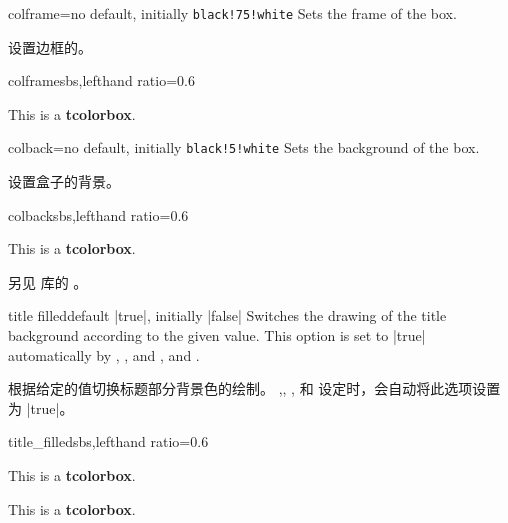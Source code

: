 \begin{docTcbKey}{colframe}{=}{no default, initially \texttt{black!75!white}}
Sets the frame  of the box.

设置边框的。
\begin{exdispExample*}{colframe}{sbs,lefthand ratio=0.6}
\begin{tcolorbox}[colframe=red!50!white]
This is a \textbf{tcolorbox}.
\end{tcolorbox}
\end{exdispExample*}
\end{docTcbKey}

\begin{docTcbKey}{colback}{=}{no default, initially \texttt{black!5!white}}
Sets the background  of the box.

设置盒子的背景。
\begin{exdispExample*}{colback}{sbs,lefthand ratio=0.6}
\begin{tcolorbox}[colback=red!50!white]
This is a \textbf{tcolorbox}.
\end{tcolorbox}
\end{exdispExample*}
\end{docTcbKey}

另见  库的 。

\begin{docTcbKey}{title filled}{}{default |true|, initially |false|}
Switches the drawing of the title background according to the given value.
This option is set to |true| automatically by ,
, and ,
and .

根据给定的值切换标题部分背景色的绘制。
,, ,
和  设定时，会自动将此选项设置为 |true|。

\begin{exdispExample*}{title_filled}{sbs,lefthand ratio=0.6}
\begin{tcolorbox}[title=My title,title filled]
This is a \textbf{tcolorbox}.
\end{tcolorbox}
\begin{tcolorbox}[title=My title,
title filled=false]
This is a \textbf{tcolorbox}.
\end{tcolorbox}
\end{exdispExample*}
\end{docTcbKey}


